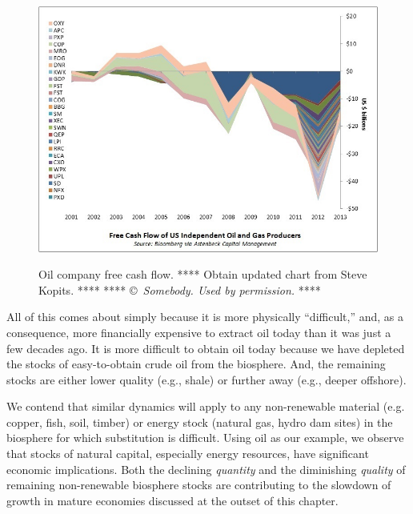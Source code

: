 \begin{figure}[!ht]
\centering\
\includegraphics[width=\linewidth]{Part_0/Chapter_Introduction/images/Cash-Flow.jpg}
\caption[Oil company free cash flow]{Oil company free cash flow.\cite{Kopits:2014aa}
**** Obtain updated chart from Steve Kopits. ****
**** \copyright~\emph{Somebody. Used by permission.} ****}
\label{fig:oil_company_free_cash_flow}
\end{figure}

All of this comes about simply because it is 
more physically ``difficult,'' and, as a consequence, 
more financially expensive
to extract oil today than it was just a few decades ago.
It is more difficult to obtain oil today because we have depleted
the stocks of easy-to-obtain crude oil from the biosphere.
And, the remaining stocks are either lower quality (e.g., shale)
or further away (e.g., deeper offshore).

We contend that similar dynamics will apply to 
any non-renewable material (e.g. copper, fish, soil, timber) 
or energy stock (natural gas, hydro dam sites)
in the biosphere
for which substitution is difficult.
Using oil as our example, we observe that 
stocks of natural capital, especially energy resources,
have significant economic implications.
Both the declining \emph{quantity} and 
the diminishing \emph{quality} of remaining non-renewable biosphere stocks 
are contributing to the slowdown of growth in mature economies
discussed at the outset of this chapter.

